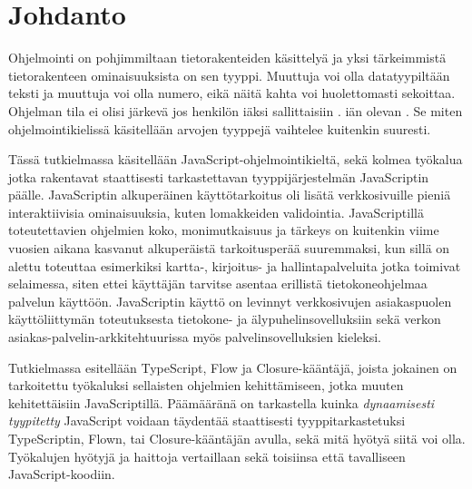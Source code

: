 \chapter{Johdanto} \label{Johdanto}

Ohjelmointi on pohjimmiltaan tietorakenteiden käsittelyä ja yksi tärkeimmistä
tietorakenteen ominaisuuksista on sen tyyppi. Muuttuja  voi olla
datatyypiltään teksti ja muuttuja  voi olla numero, eikä näitä kahta voi
huolettomasti sekoittaa. Ohjelman tila ei olisi järkevä jos henkilön
iäksi sallittaisiin .
iän olevan . Se miten ohjelmointikielissä käsitellään arvojen tyyppejä
vaihtelee kuitenkin suuresti.

Tässä tutkielmassa käsitellään JavaScript-ohjelmointikieltä,
sekä kolmea työkalua\newline
jotka rakentavat staattisesti tarkastettavan tyyppijärjestelmän
JavaScriptin päälle.\newline
JavaScriptin alkuperäinen käyttötarkoitus
oli lisätä verkkosivuille pieniä interaktiivisia ominaisuuksia,
kuten lomakkeiden validointia. JavaScriptillä
toteutettavien ohjelmien koko, monimutkaisuus ja tärkeys on kuitenkin viime
vuosien aikana kasvanut alkuperäistä tarkoitusperää suuremmaksi, kun sillä on
alettu toteuttaa esimerkiksi kartta-, kirjoitus- ja hallintapalveluita jotka
toimivat selaimessa, siten ettei käyttäjän tarvitse asentaa erillistä
tietokoneohjelmaa palvelun käyttöön.
JavaScriptin käyttö on levinnyt verkkosivujen asiakaspuolen käyttöliittymän
toteutuksesta tietokone- ja älypuhelinsovelluksiin sekä verkon
asiakas-palvelin-arkkitehtuurissa myös palvelinsovelluksien kieleksi.

Tutkielmassa esitellään TypeScript, Flow ja Closure-kääntäjä, joista jokainen on
tarkoitettu työkaluksi sellaisten ohjelmien kehittämiseen,
jotka muuten kehitettäisiin\newline
JavaScriptillä. Päämääränä on tarkastella kuinka \textit{dynaamisesti tyypitetty}
JavaScript voidaan täydentää staattisesti tyyppitarkastetuksi
TypeScriptin, Flown, tai Closure-kääntäjän avulla, sekä mitä hyötyä siitä voi
olla. Työkalujen hyötyjä ja haittoja vertaillaan sekä toisiinsa että
tavalliseen JavaScript-koodiin.
